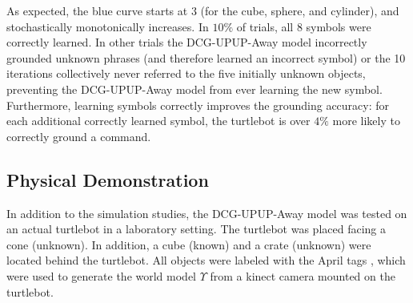 As expected, the blue curve starts at $3$ (for the cube, sphere, and cylinder), and stochastically monotonically increases.
In $10\%$ of trials, all $8$ symbols were correctly learned. In other trials the DCG-UPUP-Away model incorrectly grounded unknown phrases (and therefore learned an incorrect symbol) or the 10 iterations collectively never referred to the five initially unknown objects, preventing the DCG-UPUP-Away model from ever learning the new symbol.
Furthermore, learning symbols correctly improves the grounding accuracy: for each additional correctly learned symbol, the turtlebot is over $4\%$ more likely to correctly ground a command. %

\subsection{Physical Demonstration}
In addition to the simulation studies, the DCG-UPUP-Away model was tested on an actual turtlebot in a laboratory setting.
The turtlebot was placed facing %
a cone (unknown).
In addition, a cube (known) and a crate (unknown) were located behind the turtlebot.
All objects were labeled with the April tags \cite{olson2011}, which were used to generate the world model $\Upsilon$ from a kinect camera mounted on the turtlebot.

